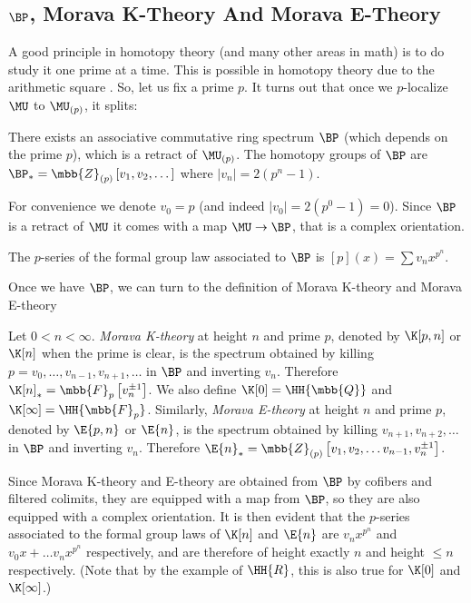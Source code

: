 \subsection{$\BP$, Morava K-Theory And Morava E-Theory}

A good principle in homotopy theory (and many other areas in math) is to do study it one prime at a time.
This is possible in homotopy theory due to the arithmetic square .
So, let us fix a prime $p$.
It turns out that once we $p$-localize $\MU$ to $\MU_{\left(p\right)}$, it splits:

\begin{theorem}
	There exists an associative commutative ring spectrum $\BP$ (which depends on the prime $p$), which is a retract of $\MU_{\left(p\right)}$.
	The homotopy groups of $\BP$ are $\BP_* = \mbb{Z}_{\left(p\right)}\left[v_1, v_2, \dotsc\right]$ where $\left|v_n\right| = 2\left(p^n-1\right)$.
\end{theorem}

For convenience we denote $v_0 = p$ (and indeed $\left|v_0\right| = 2\left(p^0-1\right) = 0$).
Since $\BP$ is a retract of $\MU$ it comes with a map $\MU \to \BP$, that is a complex orientation.

\begin{proposition}
	The $p$-series of the formal group law associated to $\BP$ is
	$\left[p\right]\left(x\right) = \sum v_n x^{p^n}$.
\end{proposition}

Once we have $\BP$, we can turn to the definition of Morava K-theory and Morava E-theory

\begin{definition}
	Let $0 < n < \infty$.
	\emph{Morava K-theory} at height $n$ and prime $p$, denoted by $\K[p,n]$ or $\K[n]$ when the prime is clear, is the spectrum obtained by killing $p=v_0, \dotsc, v_{n-1}, v_{n+1}, \dotsc$ in $\BP$ and inverting $v_n$.
	Therefore $\K[n]_* = \mbb{F}_p\left[v_n^{\pm 1}\right]$.
	We also define $\K[0] = \HH{\mbb{Q}}$ and $\K[\infty] = \HH{\mbb{F}_p}$.
	Similarly, \emph{Morava E-theory} at height $n$ and prime $p$, denoted by $\E{p,n}$ or $\E{n}$, is the spectrum obtained by killing $v_{n+1}, v_{n+2}, \dotsc$ in $\BP$ and inverting $v_n$.
	Therefore $\E{n}_* = \mbb{Z}_{\left(p\right)}\left[v_1, v_2, \dotsc v_{n-1}, v_n^{\pm 1}\right]$.
\end{definition}

Since Morava K-theory and E-theory are obtained from $\BP$ by cofibers and filtered colimits, they are equipped with a map from $\BP$, so they are also equipped with a complex orientation.
It is then evident that the $p$-series associated to the formal group laws of $\K[n]$ and $\E{n}$ are $v_n x^{p^n}$ and $v_0 x + \dotsc v_n x^{p^n}$ respectively, and are therefore of height exactly $n$ and height $\leq n$ respectively.
(Note that by the example of $\HH{R}$, this is also true for $\K[0]$ and $\K[\infty]$.)

